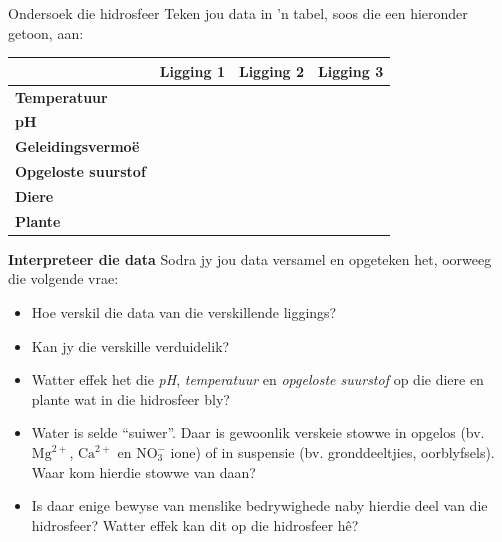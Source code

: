 \begin{Investigation}{Ondersoek die hidrosfeer }
Teken jou data in 'n tabel, soos die een hieronder getoon, aan:
          \begin{table}[H]
        \begin{center}
      \label{m38138*id334712}
    \noindent
      \begin{tabular}{|l|l|l|l|}\hline
         &
        \textbf{Ligging 1} &
        \textbf{Ligging 2} &
        \textbf{Ligging 3} \\ \hline
        \textbf{Temperatuur} &
         &
         &
       \\ \hline
        \textbf{pH} &
         &
         &
      \\ \hline
        \textbf{Geleidingsvermo\"{e}} &
         &
         &
       \\ \hline
        \textbf{Opgeloste suurstof} &
         &
         &
        \\ \hline
        \textbf{Diere} &
         &
         &
        \\ \hline
        \textbf{Plante} &
         &
         &
        \\ \hline
    \end{tabular}
      \end{center}
\end{table}
    \par
  \label{m38138*uid9}\item \textbf{Interpreteer die data}
Sodra jy jou data versamel en opgeteken het, oorweeg die volgende vrae:
\label{m38138*id334958}\begin{itemize}[noitemsep]
            \label{m38138*uid10}\item Hoe verskil die data van die verskillende liggings?
\label{m38138*uid11}\item Kan jy die verskille verduidelik? 
\label{m38138*uid12}\item Watter effek het die \textsl{pH}, \textsl{temperatuur} en \textsl{opgeloste suurstof} op die diere en plante wat in die hidrosfeer bly?
\label{m38138*uid13}\item Water is selde “suiwer”. Daar is gewoonlik verskeie stowwe in opgelos (bv. ${\text{Mg}}^{2+}$, ${\text{Ca}}^{2+}$ en $\text{NO}_{3}^{-}$ ione) of in suspensie (bv. gronddeeltjies, oorblyfsels). Waar kom hierdie stowwe van daan?
\label{m38138*uid14}\item Is daar enige bewyse van menslike bedrywighede naby hierdie deel van die hidrosfeer? Watter effek kan dit op die hidrosfeer h\^{e}?
\end{itemize}
\end{Investigation}


